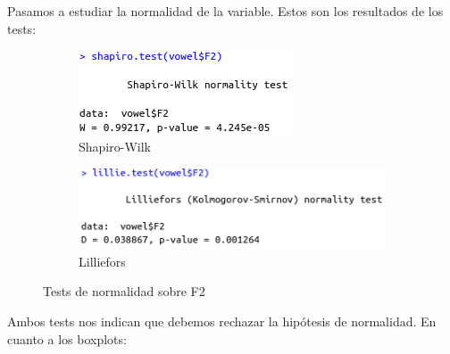 Pasamos a estudiar la normalidad de la variable. Estos son los resultados de los tests:

\begin{figure}[H]
	\centering
	\begin{subfigure}{.5\textwidth}
		\centering
		\includegraphics[width=.7\linewidth]{sw-F2.png}
		\caption{Shapiro-Wilk}
		\label{fig:sw-F2}
	\end{subfigure}%
	\begin{subfigure}{.5\textwidth}
		\centering
		\includegraphics[width=.7\linewidth]{l-F2.png}
		\caption{Lilliefors}
		\label{fig:l-F2}
	\end{subfigure}
	\caption{Tests de normalidad sobre F2}
	\label{fig:normF2}
\end{figure}

Ambos tests nos indican que debemos rechazar la hipótesis de normalidad. En cuanto a los boxplots:

